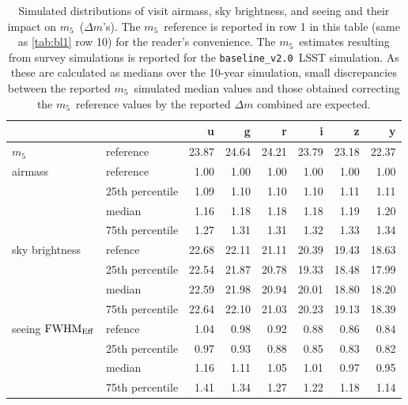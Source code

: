 \documentclass[PST,authoryear,toc]{lsstdoc}
\newcommand{\mf}{\ensuremath{m_5}}
\newcommand{\baseline}{\texttt{baseline\_v2.0}}
\newcommand{\fwhme}{\ensuremath{{\rm FWHM}_\mathrm{Eff}}}
\begin{document}
\begin{table}
\caption{Simulated distributions of visit airmass, sky brightness, and seeing and their impact on \mf\ ($\Delta m$'s). The \mf\ reference is reported in row 1 in this table (same as \autoref{tab:bl1} row 10) for the reader's convenience. The \mf\ estimates resulting from survey simulations is reported for the \baseline\ LSST simulation. As these are calculated as medians over the 10-year simulation, small discrepancies between the reported \mf\ simulated median values and those obtained correcting the \mf\ reference values by the reported $\Delta m$ combined are expected.}\label{tab:bl2}
    \centering
\begin{tabular}{llrrrrrr}
\hline
{} &&      u &      g &      r &      i &      z &      y \\
\hline
\mf &reference %
&  23.87 &  24.64 &  24.21 &  23.79 &  23.18 &  22.37 \\
\hline
\hline
airmass &reference                 &   1.00 &   1.00 &   1.00 &   1.00 &   1.00 &   1.00 \\
 &25th percentile       &   1.09 &   1.10 &   1.10 &   1.10 &   1.11 &   1.11 \\
 &median                &   1.16 &   1.18 &   1.18 &   1.18 &   1.19 &   1.20 \\
 &75th percentile       &   1.27 &   1.31 &   1.31 &   1.32 &   1.33 &   1.34 \\
\hline
sky brightness& refence           &  22.68 &  22.11 &  21.11 &  20.39 &  19.43 &  18.63 \\
 &25th percentile &  22.54 &  21.87 &  20.78 &  19.33 &  18.48 &  17.99 \\
& median          &  22.59 &  21.98 &  20.94 &  20.01 &  18.80 &  18.20 \\
 &75th percentile &  22.64 &  22.10 &  21.03 &  20.23 &  19.13 &  18.39 \\
\hline
seeing \fwhme& refence             &   1.04 &   0.98 &   0.92 &   0.88 &   0.86 &   0.84 \\
 &25th percentile &   0.97 &   0.93 &   0.88 &   0.85 &   0.83 &   0.82 \\
 &median          &   1.16 &   1.11 &   1.05 &   1.01 &   0.97 &   0.95 \\
 &75th percentile &   1.41 &   1.34 &   1.27 &   1.22 &   1.18 &   1.14 \\


\end{tabular}
\end{table}
\end{document}
